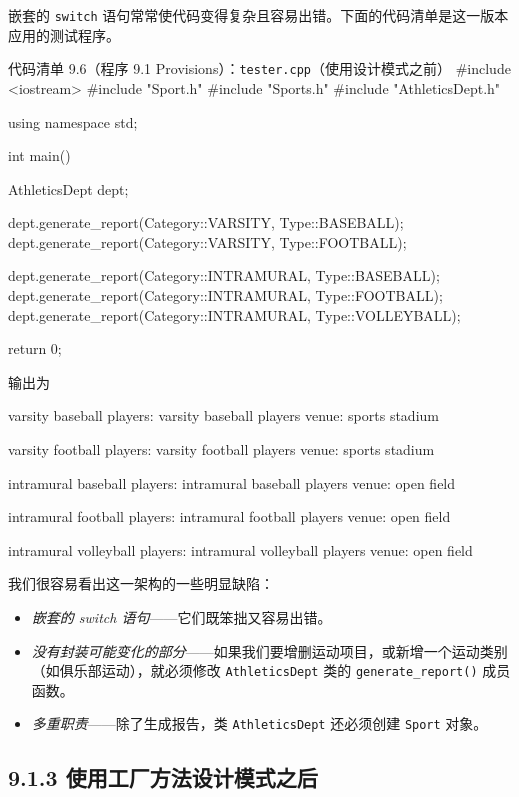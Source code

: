 嵌套的 \texttt{switch} 语句常常使代码变得复杂且容易出错。下面的代码清单是这一版本应用的测试程序。

\begin{codeboxt}{代码清单 9.6（程序 9.1 Provisions）：\texttt{tester.\allowbreak{}cpp}（使用设计模式之前）}
#include <iostream>
#include "Sport.h"
#include "Sports.h"
#include "AthleticsDept.h"

using namespace std;

int main()
{
    AthleticsDept dept;

    dept.generate_report(Category::VARSITY, Type::BASEBALL);
    dept.generate_report(Category::VARSITY, Type::FOOTBALL);

    dept.generate_report(Category::INTRAMURAL, Type::BASEBALL);
    dept.generate_report(Category::INTRAMURAL, Type::FOOTBALL);
    dept.generate_report(Category::INTRAMURAL, Type::VOLLEYBALL);

    return 0;
}
\end{codeboxt}

输出为

\begin{codebox}
varsity baseball
  players: varsity baseball players
    venue: sports stadium

varsity football
  players: varsity football players
    venue: sports stadium

intramural baseball
  players: intramural baseball players
    venue: open field

intramural football
  players: intramural football players
    venue: open field

intramural volleyball
  players: intramural volleyball players
    venue: open field
\end{codebox}

我们很容易看出这一架构的一些明显缺陷：

\begin{itemize}
\item \emph{嵌套的 switch 语句}——它们既笨拙又容易出错。
\item \emph{没有封装可能变化的部分}——如果我们要增删运动项目，或新增一个运动类别（如俱乐部运动），就必须修改 \texttt{Athletics\allowbreak{}Dept} 类的 \texttt{generate\_\allowbreak{}report(\allowbreak{})\allowbreak{}} 成员函数。
\item \emph{多重职责}——除了生成报告，类 \texttt{Athletics\allowbreak{}Dept} 还必须创建 \texttt{Sport} 对象。
\end{itemize}

\subsection{9.1.3 使用工厂方法设计模式之后}

